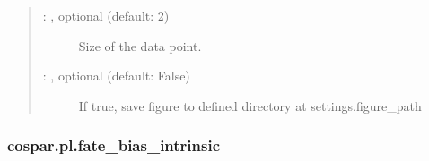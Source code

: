 \documentclass[letterpaper,10pt,english]{sphinxmanual}
\begin{document}
\begin{fulllineitems}
\begin{quote}
\begin{description}
\begin{description}
\item[{ : , optional (default: 2)}] \leavevmode
Size of the data point.

\item[{ : , optional (default: False)}] \leavevmode
If true, save figure to defined directory at settings.figure\_path

\end{description}

\end{description}\end{quote}

\end{fulllineitems}



\subsubsection{cospar.pl.fate\_bias\_intrinsic}
\label{\detokenize{cospar.pl.fate_bias_intrinsic:cospar-pl-fate-bias-intrinsic}}\label{\detokenize{cospar.pl.fate_bias_intrinsic::doc}}
\end{document}
